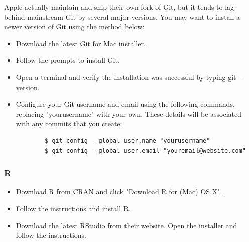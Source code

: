 \documentclass[11pt]{article} %
\begin{document}
      Apple actually maintain and ship their own fork of Git, but it tends to lag behind mainstream Git by several major versions. 
      You may want to install a newer version of Git using the method below:
      \begin{itemize}
      	\item Download the latest Git for \href{https://git-scm.com/download/mac}{Mac installer}. 
      	\item Follow the prompts to install Git. 
      	\item Open a terminal and verify the installation was successful by typing git --version. 
      	\item Configure your Git username and email using the following commands, replacing "yourusername" with your own. 
        These details will be associated with any commits that you create:
      	\begin{lstlisting}
      	$ git config --global user.name "yourusername"
      	$ git config --global user.email "youremail@website.com"
      	\end{lstlisting}
      \end{itemize}
    
    \subsubsection{R}
    
      \begin{itemize}
      	\item Download R from \href{http://cran.us.r-project.org/}{CRAN} and click "Download R for (Mac) OS X". 
      	\item Follow the instructions and install R. 
      	\item Download the latest RStudio from their \href{https://www.rstudio.com/products/rstudio/download/}{website}. 
        Open the installer and follow the instructions. 
      \end{itemize}







%
\end{document}

